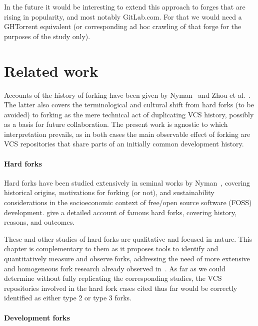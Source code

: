 In the future it would be interesting to extend this approach to forges that
are rising in popularity, and most notably GitLab.com. For that we would need
a GHTorrent equivalent (or corresponding ad hoc crawling of that forge for the
purposes of the study only).


\section{Related work}%
\label{sec:forks-related}

Accounts of the history of forking have been given by
Nyman~\cite{nyman2016forkhistory} and Zhou et al.~\cite[Section
2]{zhou2019fork}. The latter also covers the terminological and cultural shift
from hard forks (to be avoided) to forking as the mere technical act of
duplicating \gls{VCS} history, possibly as a basis for future collaboration.
The present work is agnostic to which interpretation prevails, as in both cases
the main observable effect of forking are \gls{VCS} repositories that share
parts of an initially common development history.


\paragraph{Hard forks}

Hard forks have been studied extensively in seminal works by
Nyman~\cite{nyman2011-fork-or-not, nyman2012forking-sustainability,
  nyman2014forking-hackers, nyman2016forkhistory}, covering historical origins,
motivations for forking (or not), and sustainability considerations in the
socioeconomic context of free/open source software (FOSS) development.
\Textcite{robles2012forks} give a detailed account of famous hard forks,
covering history, reasons, and outcomes.

These and other studies of hard forks are qualitative and focused in nature.
  This chapter is complementary to
them as it proposes tools to identify and quantitatively measure and observe
forks, addressing the need of more extensive and homogeneous fork research
already observed in~\cite{robles2012forks}. As far as we could determine
without fully replicating the corresponding studies, the \gls{VCS} repositories
involved in the hard fork cases cited thus far would be correctly identified as
either type 2 or type 3 forks.


\paragraph{Development forks}

